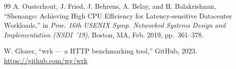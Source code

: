\documentclass[conference]{IEEEtran}
\begin{document}
\begin{thebibliography}{99}
A. Ousterhout, J. Fried, J. Behrens, A. Belay, and H. Balakrishnan,
``Shenango: Achieving High CPU Efficiency for Latency-sensitive Datacenter
Workloads,''
in \textit{Proc. 16th USENIX Symp. Networked Systems Design and
Implementation (NSDI~'19)},
Boston, MA, Feb. 2019, pp.~361--378.

W. Glozer, ``wrk --- a HTTP benchmarking tool,'' GitHub, 2023.
\url{https://github.com/wg/wrk}

\end{thebibliography}
\end{document}
